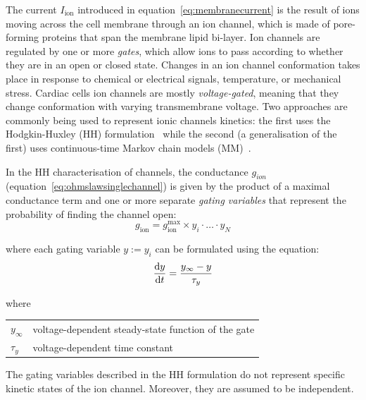 \vspace{0.2cm}\noindent
The current $I_{\textrm{ion}}$ introduced in equation~\eqref{eq:membranecurrent} is the result of ions moving across the cell membrane through an ion channel, which is made of pore-forming proteins that span the membrane lipid bi-layer. Ion channels are regulated by one or more \textit{gates}, which allow ions to pass according to whether they are in an open or closed state. Changes in an ion channel conformation takes place in response to chemical or electrical signals, temperature, or mechanical stress. Cardiac cells ion channels are mostly \textit{voltage-gated}, meaning that they change conformation with varying transmembrane voltage. Two approaches are commonly being used to represent ionic channels kinetics: the first uses the Hodgkin-Huxley (\acs{HH}) formulation~\cite{Hodgkin:1952} while the second (a generalisation of the first) uses continuous-time Markov chain models (\acs{MM})~\cite{Fink:2009}.

\vspace{0.2cm}
In the HH characterisation of channels, the conductance $g_{ion}$ (equation~\eqref{eq:ohmslawsinglechannel}) is given by the product of a maximal conductance term and one or more separate \textit{gating variables} that represent the probability of finding the channel open:
%
\begin{equation}
    g_{\textrm{ion}} = g_{\textrm{ion}}^{\textrm{max}}\times y_i\cdot\dots\cdot y_N
\end{equation}

\noindent
where each gating variable $y:=y_i$ can be formulated using the equation:
%
\begin{equation}
    \dfrac{\mathrm{d}{y}}{\mathrm{d}{t}} = \frac{y_{\infty}-y}{\tau_y}
\end{equation}

\noindent
where

\vspace{0.5cm}
\begin{tabular}{ll}
$y_{\infty}$ & voltage-dependent steady-state function of the gate \\
$\tau_{y}$ & voltage-dependent time constant
\end{tabular}

\vspace{0.5cm}
\noindent
The gating variables described in the HH formulation do not represent specific kinetic states of the ion channel. Moreover, they are assumed to be independent.

